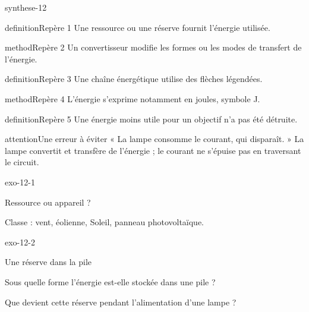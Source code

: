 \documentclass[12pt,twoside,openany]{book}
\begin{document}
\label{ch-12-bilan}
\begin{pcFiche}{synthese-12}
\begin{pcEncadre}{definition}{Repère 1}
Une ressource ou une réserve fournit l’énergie utilisée.\par
\end{pcEncadre}
\begin{pcEncadre}{method}{Repère 2}
Un convertisseur modifie les formes ou les modes de transfert de l’énergie.\par
\end{pcEncadre}
\begin{pcEncadre}{definition}{Repère 3}
Une chaîne énergétique utilise des flèches légendées.\par
\end{pcEncadre}
\begin{pcEncadre}{method}{Repère 4}
L’énergie s’exprime notamment en joules, symbole J.\par
\end{pcEncadre}
\begin{pcEncadre}{definition}{Repère 5}
Une énergie moins utile pour un objectif n’a pas été détruite.\par
\end{pcEncadre}
\begin{pcEncadre}{attention}{Une erreur à éviter}
« La lampe consomme le courant, qui disparaît. » La lampe convertit et transfère de l’énergie ; le courant ne s’épuise pas en traversant le circuit.\par
\end{pcEncadre}
\end{pcFiche}
\clearpage{}
\begin{blocLivre}{exo-12-1}
\begin{exercice}[1]{Ressource ou appareil ?}
\begin{questions}
\item Classe : vent, éolienne, Soleil, panneau photovoltaïque.
\end{questions}
\end{exercice}\end{blocLivre}
\begin{blocLivre}{exo-12-2}
\begin{exercice}[1]{Une réserve dans la pile}
\begin{questions}
\item Sous quelle forme l’énergie est-elle stockée dans une pile ?
\item Que devient cette réserve pendant l’alimentation d’une lampe ?
\end{questions}
\end{exercice}\end{blocLivre}
\end{document}
